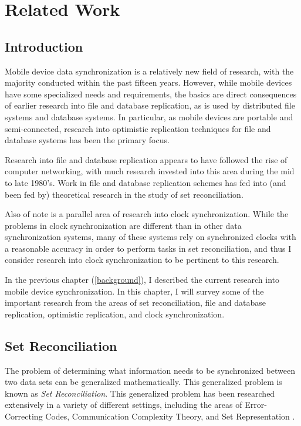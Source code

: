 \chapter{Related Work}

\section{Introduction}
Mobile device data synchronization is a relatively new field of research, with the majority conducted within the past fifteen years.  However, while mobile devices have some specialized needs and requirements, the basics are direct consequences of earlier research into file and database replication, as is used by distributed file systems and database systems.  In particular, as mobile devices are portable and semi-connected, research into optimistic replication techniques for file and database systems has been the primary focus.  

Research into file and database replication appears to have followed the rise of computer networking, with much research invested into this area during the mid to late 1980's.  Work in file and database replication schemes has fed into (and been fed by) theoretical research in the study of set reconciliation.

Also of note is a parallel area of research into clock synchronization.  While the problems in clock synchronization are different than in other data synchronization systems, many of these systems rely on synchronized clocks with a reasonable accuracy in order to perform tasks in set reconciliation, and thus I consider research into clock synchronization to be pertinent to this research.

In the previous chapter (\ref{background}), I described the current research into mobile device synchronization.  In this chapter, I will survey some of the important research from the areas of set reconciliation, file and database replication, optimistic replication, and clock synchronization.

\section{Set Reconciliation}

The problem of determining what information needs to be synchronized between two data sets can be generalized mathematically.  This generalized problem is known as \emph{Set Reconciliation}.  This generalized problem has been researched extensively in a variety of different settings, including the areas of Error-Correcting Codes, Communication Complexity Theory, and Set Representation \cite{RefWorks:17}.

